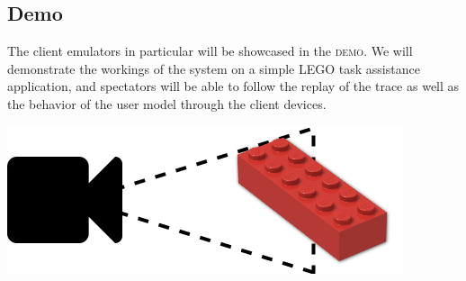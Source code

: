 \documentclass[portrait, a1]{KTHEEposter}
\begin{document}
\begin{pcolumns}[3]
\begin{pcolumn}[2]
\begin{pframe}[.48]
                \section{Demo}
                The client emulators in particular will be showcased in the \textsc{demo}.
                We will demonstrate the workings of the system on a simple LEGO task assistance application, and spectators will be able to follow the replay of the trace as well as the behavior of the user model through the client devices.
                \medskip
                \begin{center}
                    \medskip
                    \includegraphics[width=.5\textwidth]{img/lego}%
                \end{center}
            \end{pframe}    
        \end{pcolumn}%
        \begin{pcolumn}[3]
            \begin{pframe}[2.14]

\end{pframe}
\end{pcolumn}
\end{pcolumns}
\end{document}
